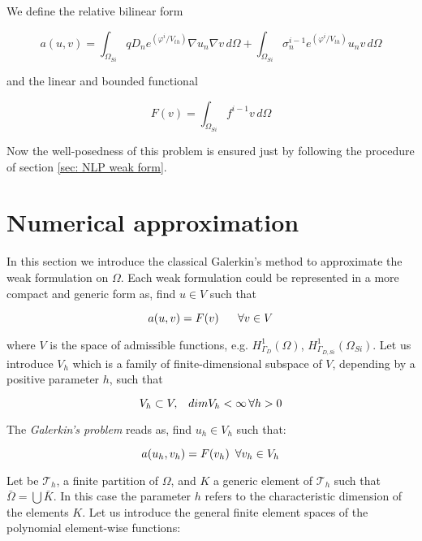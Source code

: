 We define the relative bilinear form

\begin{equation}
\label{eq: bilinear form LEC}
a(u,v) =  \int_{\Omega_{Si}}  q D_n e^{(\varphi^{i}/V_{th})} \nabla u_n \nabla v \, d\Omega + \int_{\Omega_{Si}} \sigma_n^{i-1} e^{(\varphi^{i}/V_{th})} u_n v \, d\Omega
\end{equation}

and the linear and bounded functional

\begin{equation}
\label{eq: functional LEC}
F(v) = \int_{\Omega_{Si}} f^{i-1}v \, d\Omega
\end{equation}

Now the well-posedness of this problem is ensured just by following the procedure of section \ref{sec: NLP weak form}.



\section{Numerical approximation}
\label{sec: Numerical approximation}


In this section we introduce the classical Galerkin's method to approximate the weak formulation on $\Omega$. Each weak formulation could be represented in a more compact and generic form as, find $u \in V$ such that

\begin{equation}
a(u,v) = F(v) \psp{10} \forall v \in V
\end{equation}

where $V$ is the space of admissible functions, e.g. $H^1_{\Gamma_D}(\Omega)$, $H^1_{\Gamma_{D,Si}}(\Omega_{Si})$.
 Let us introduce $V_h$ which is a family of finite-dimensional subspace of $V$, depending by a positive parameter $h$, such that

\begin{equation}
V_h \subset V, \psp{5} dim V_h < \infty \, \forall h>0
\end{equation}

The \textit{Galerkin's problem} reads as, find $u_h\in V_h$ such that:

\begin{equation}
\label{eq: general galerkin problem}
 a(u_h,v_h) = F(v_h) \psp{3} \forall v_h \in V_h
\end{equation}

Let be $\mathcal{T}_h$, a finite partition of $\Omega$, and $K$ a generic element of $\mathcal{T}_h$ such that  $\bar{\Omega} =  \bigcup \bar{K}$. In this case the parameter $h$ refers to the characteristic dimension of the elements $K$.
Let us introduce the general finite element spaces of the polynomial element-wise functions:

